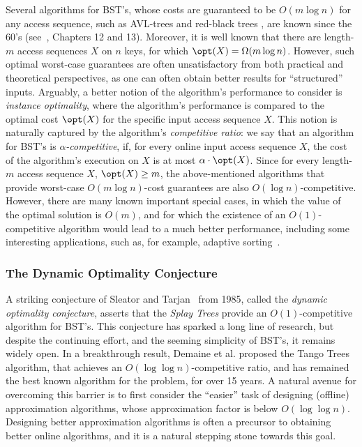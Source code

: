 \documentclass{toc}
\begin{document}
Several algorithms for BST's, whose costs are guaranteed to be $O(m\log n)$ for any access sequence, such as AVL-trees \cite{avl} and red-black trees \cite{Bayer1972}, are known since the 60's (see~\cite{cormen2022introduction}, Chapters 12 and 13). Moreover, it is well known that there are length-$m$ access sequences $X$ on $n$ keys, for which $\opt(X)=\Omega(m\log n)$.
However, such optimal worst-case  guarantees are often unsatisfactory from both practical and theoretical perspectives, as one can often obtain better results for ``structured'' inputs. 
Arguably, a better notion of the algorithm's performance to consider is \emph{instance optimality}, where the algorithm's performance is compared to the optimal cost $\opt(X)$ for the specific input access sequence $X$. This notion is naturally captured by the algorithm's \emph{competitive ratio}:  
%
we say that an algorithm for BST's is \emph{$\alpha$-competitive}, if, for every online input access sequence
$X$, the cost of the algorithm's execution on $X$ is at most $\alpha \cdot \opt(X)$.
Since for every length-$m$ access sequence $X$, $\opt(X)\geq m$, the above-mentioned algorithms that provide worst-case $O(m\log n)$-cost guarantees are also $O(\log n)$-competitive. 
However, there are many known important special cases, in which the value of the optimal solution is $O(m)$, and for which the existence of an $O(1)$-competitive algorithm would lead to a much better performance, including some interesting applications, such as, for example, adaptive sorting~\cite{Tar85,chaudhuri,split_Luc91,deque_Sun92,deque_Elm04,deque_Pet08,DS09,finger1,finger2,BoseDIL14,FOCS15,our_wads,IL-lazy}. 


\subsubsection{The Dynamic Optimality Conjecture} 

A striking conjecture of Sleator and Tarjan~\cite{ST85} from 1985, called the \emph{dynamic optimality conjecture}, asserts that the \emph{Splay Trees} provide an $O(1)$-competitive algorithm for BST's. 
This conjecture has sparked a long line of research, but despite the continuing effort, and the seeming simplicity of BST's, it remains widely open.
In a breakthrough result, Demaine et al. \cite{tango} proposed the Tango Trees algorithm, that achieves an $O(\log\log n)$-competitive ratio, and has remained the best known algorithm for the problem, for over 15 years.   
A natural avenue for overcoming this barrier is to first consider the ``easier'' task of designing (offline) approximation algorithms, whose approximation factor is below $O(\log \log n)$. Designing better approximation algorithms is often a precursor to obtaining better online algorithms, and it is a natural stepping stone towards this goal.  
\end{document}
